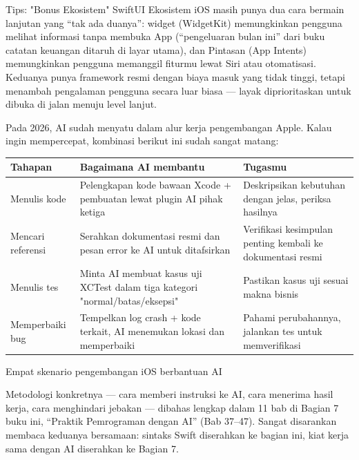 \begin{tcbinfo}{Tips: "Bonus Ekosistem" SwiftUI}
Ekosistem iOS masih punya dua cara bermain lanjutan yang “tak ada duanya”: widget (WidgetKit) memungkinkan pengguna melihat informasi tanpa membuka App (“pengeluaran bulan ini” dari buku catatan keuangan ditaruh di layar utama), dan Pintasan (App Intents) memungkinkan pengguna memanggil fiturmu lewat Siri atau otomatisasi. Keduanya punya framework resmi dengan biaya masuk yang tidak tinggi, tetapi menambah pengalaman pengguna secara luar biasa — layak diprioritaskan untuk dibuka di jalan menuju level lanjut.

\end{tcbinfo}


Pada 2026, AI sudah menyatu dalam alur kerja pengembangan Apple. Kalau ingin mempercepat, kombinasi berikut ini sudah sangat matang:

\begin{center}
\begin{tabularx}{\linewidth}{|X|X|X|}
\hline
\textbf{Tahapan} & \textbf{Bagaimana AI membantu} & \textbf{Tugasmu} \tabularnewline
\hline
Menulis kode & Pelengkapan kode bawaan Xcode + pembuatan lewat plugin AI pihak ketiga & Deskripsikan kebutuhan dengan jelas, periksa hasilnya \tabularnewline
Mencari referensi & Serahkan dokumentasi resmi dan pesan error ke AI untuk ditafsirkan & Verifikasi kesimpulan penting kembali ke dokumentasi resmi \tabularnewline
Menulis tes & Minta AI membuat kasus uji XCTest dalam tiga kategori "normal/batas/eksepsi" & Pastikan kasus uji sesuai makna bisnis \tabularnewline
Memperbaiki bug & Tempelkan log crash + kode terkait, AI menemukan lokasi dan memperbaiki & Pahami perubahannya, jalankan tes untuk memverifikasi \tabularnewline
\hline
\end{tabularx}
\end{center}

\begin{center}\small\color{gray}Empat skenario pengembangan iOS berbantuan AI\end{center}

Metodologi konkretnya — cara memberi instruksi ke AI, cara menerima hasil kerja, cara menghindari jebakan — dibahas lengkap dalam 11 bab di Bagian 7 buku ini, “Praktik Pemrograman dengan AI” (Bab 37–47). Sangat disarankan membaca keduanya bersamaan: sintaks Swift diserahkan ke bagian ini, kiat kerja sama dengan AI diserahkan ke Bagian 7.

